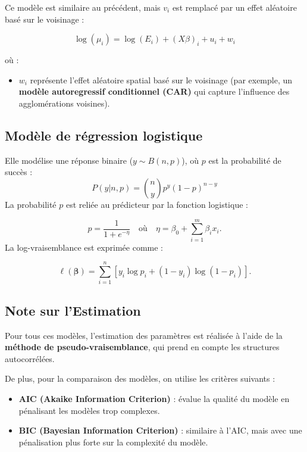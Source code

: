 \documentclass[
]{article}
\providecommand{\tightlist}{%
  \setlength{\itemsep}{0pt}\setlength{\parskip}{0pt}}
\begin{document}
Ce modèle est similaire au précédent, mais \(v_i\) est remplacé par un
effet aléatoire basé sur le voisinage :

\[
\log(\mu_i) = \log(E_i) + (X\beta)_i + u_i + w_i
\]

où :

\begin{itemize}
\tightlist
\item
  \(w_i\) représente l'effet aléatoire spatial basé sur le voisinage
  (par exemple, un \textbf{modèle autoregressif conditionnel (CAR)} qui
  capture l'influence des agglomérations voisines).
\end{itemize}

\hypertarget{moduxe8le-de-ruxe9gression-logistique}{%
\subsection{Modèle de régression
logistique}\label{moduxe8le-de-ruxe9gression-logistique}}

Elle modélise une réponse binaire (\(y \sim B(n, p)\)), où \(p\) est la
probabilité de succès : \[
P(y | n, p) = \binom{n}{y} p^y (1-p)^{n-y}
\] La probabilité \(p\) est reliée au prédicteur par la fonction
logistique :

\[
p = \frac{1}{1 + e^{-\eta}} \quad \text{où} \quad \eta = \beta_0 + \sum_{i=1}^m \beta_i x_i.
\] La log-vraisemblance est exprimée comme :

\[
\ell(\boldsymbol{\beta}) = \sum_{i=1}^n \left[ y_i \log{p_i} + (1-y_i) \log{(1-p_i)} \right].
\]

\hypertarget{note-sur-lestimation}{%
\subsection{Note sur l'Estimation}\label{note-sur-lestimation}}

Pour tous ces modèles, l'estimation des paramètres est réalisée à l'aide
de la \textbf{méthode de pseudo-vraisemblance}, qui prend en compte les
structures autocorrélées.

De plus, pour la comparaison des modèles, on utilise les critères
suivants :

\begin{itemize}
\tightlist
\item
  \textbf{AIC (Akaike Information Criterion)} : évalue la qualité du
  modèle en pénalisant les modèles trop complexes.
\item
  \textbf{BIC (Bayesian Information Criterion)} : similaire à l'AIC,
  mais avec une pénalisation plus forte sur la complexité du modèle.
\end{itemize}
\end{document}
